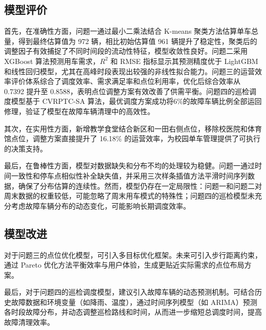 \documentclass[withoutpreface,bwprint]{cumcmthesis}
\begin{document}
\subsection{模型评价}

首先，在准确性方面，问题一通过最小二乘法结合 K-means 聚类方法估算单车总量，得到最终估算值为 972 辆，相比初始估算值 961 辆提升了稳定性，聚类后的调整因子有效捕捉了不同时间段的流动性特征，模型收敛性良好。问题二采用 XGBoost 算法预测用车需求，$R^2$ 和 RMSE 指标显示其预测精度优于 LightGBM 和线性回归模型，尤其在高峰时段表现出较强的非线性拟合能力。问题三的运营效率评价体系综合了调度效率、需求满足率和点位利用率，优化后综合效率从 0.7392 提升至 0.8588，表明点位调整方案有效改善了供需平衡。问题四的巡检调度模型基于 CVRPTC-SA 算法，最优调度方案成功将6\%的故障车辆比例全部运回修理，验证了模型在故障车辆清理中的高效性。

其次，在实用性方面，新增教学食堂结合新区和一田右侧点位，移除校医院和体育馆点位，调整方案直接提升了 16.18\% 的运营效率，为校园单车管理提供了可执行的决策支持。

最后，在鲁棒性方面，模型对数据缺失和分布不均的处理较为稳健。问题一通过时间一致性和停车点相似性补全缺失值，并采用三次样条插值方法平滑时间序列数据，确保了分布估算的连续性。然而，模型仍存在一定局限性：问题一和问题二对周末数据的权重较低，可能忽略了周末用车模式的特殊性；问题四的巡检模型未充分考虑故障车辆分布的动态变化，可能影响长期调度效率。
\subsection{模型改进}

对于问题三的点位优化模型，可引入多目标优化框架。未来可引入步行距离约束，通过 Pareto 优化方法平衡效率与用户体验，生成更贴近实际需求的点位布局方案。

最后，对于问题四的巡检调度模型，建议引入故障车辆的动态预测机制。可结合历史故障数据和环境变量（如降雨、温度），通过时间序列模型（如 ARIMA）预测各时段故障分布，并动态调整巡检路线和时间，从而进一步缩短总调度时间，提高故障清理效率。
\end{document}
